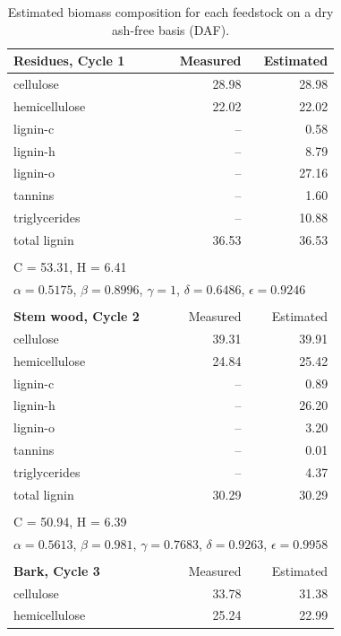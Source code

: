 \begin{longtable}{p{8cm}rr}
    \caption{Estimated biomass composition for each feedstock on a dry ash-free basis (DAF).}
    \label{tab:biocomp3} \\
    \textbf{Residues, Cycle 1} & Measured & Estimated \\
    \midrule
    cellulose       & 28.98  & 28.98 \\
    hemicellulose   & 22.02  & 22.02 \\
    lignin-c        & --     & 0.58 \\
    lignin-h        & --     & 8.79 \\
    lignin-o        & --     & 27.16 \\
    tannins         & --     & 1.60 \\
    triglycerides   & --     & 10.88 \\
    total lignin    & 36.53  & 36.53 \\
    \\
    \multicolumn{3}{l}{C = 53.31, H = 6.41} \\
    \multicolumn{3}{l}{$\alpha = 0.5175$, $\beta = 0.8996$, $\gamma = 1$, $\delta = 0.6486$, $\epsilon = 0.9246$} \\
    \\
    \textbf{Stem wood, Cycle 2} & Measured & Estimated \\
    \midrule
    cellulose     & 39.31 & 39.91 \\
    hemicellulose & 24.84 & 25.42 \\
    lignin-c      & --    & 0.89 \\
    lignin-h      & --    & 26.20 \\
    lignin-o      & --    & 3.20 \\
    tannins       & --    & 0.01 \\
    triglycerides & --    & 4.37 \\
    total lignin  & 30.29 & 30.29 \\
    \\
    \multicolumn{3}{l}{C = 50.94, H = 6.39} \\
    \multicolumn{3}{l}{$\alpha = 0.5613$, $\beta = 0.981$, $\gamma = 0.7683$, $\delta = 0.9263$, $\epsilon = 0.9958$} \\
    \\
    \textbf{Bark, Cycle 3} & Measured & Estimated \\
    \midrule
    cellulose     & 33.78 & 31.38 \\
    hemicellulose & 25.24 & 22.99 \\

\end{longtable}
